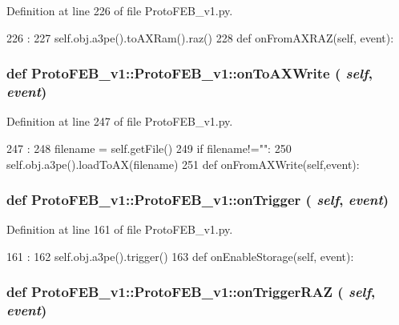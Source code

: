 Definition at line 226 of file ProtoFEB\_\-v1.py.


\begin{DoxyCode}
226                               :
227         self.obj.a3pe().toAXRam().raz()
228 
    def onFromAXRAZ(self, event):
\end{DoxyCode}
\hypertarget{classProtoFEB__v1_1_1ProtoFEB__v1_a26053ea3e05730fec3a71ef6864d0291}{
\subsubsection[{onToAXWrite}]{\setlength{\rightskip}{0pt plus 5cm}def ProtoFEB\_\-v1::ProtoFEB\_\-v1::onToAXWrite ( {\em self}, \/   {\em event})}}
\label{classProtoFEB__v1_1_1ProtoFEB__v1_a26053ea3e05730fec3a71ef6864d0291}


Definition at line 247 of file ProtoFEB\_\-v1.py.


\begin{DoxyCode}
247                                :
248         filename = self.getFile()
249         if filename!="":
250             self.obj.a3pe().loadToAX(filename)
251 
    def onFromAXWrite(self,event):
\end{DoxyCode}
\hypertarget{classProtoFEB__v1_1_1ProtoFEB__v1_a0aeaa7877d9e24260c3d4239845f2b4c}{
\subsubsection[{onTrigger}]{\setlength{\rightskip}{0pt plus 5cm}def ProtoFEB\_\-v1::ProtoFEB\_\-v1::onTrigger ( {\em self}, \/   {\em event})}}
\label{classProtoFEB__v1_1_1ProtoFEB__v1_a0aeaa7877d9e24260c3d4239845f2b4c}


Definition at line 161 of file ProtoFEB\_\-v1.py.


\begin{DoxyCode}
161                               :
162         self.obj.a3pe().trigger()
163 
    def onEnableStorage(self, event):
\end{DoxyCode}
\hypertarget{classProtoFEB__v1_1_1ProtoFEB__v1_a23f6f93fd12ef1dd76a798748b8f775d}{
\subsubsection[{onTriggerRAZ}]{\setlength{\rightskip}{0pt plus 5cm}def ProtoFEB\_\-v1::ProtoFEB\_\-v1::onTriggerRAZ ( {\em self}, \/   {\em event})}}
\label{classProtoFEB__v1_1_1ProtoFEB__v1_a23f6f93fd12ef1dd76a798748b8f775d}


